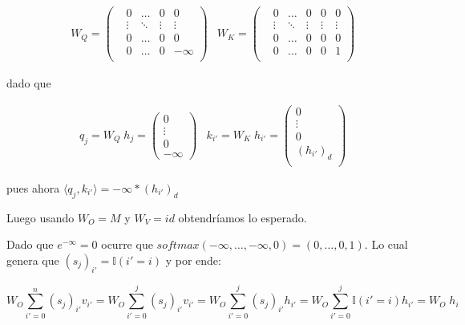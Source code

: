\begin{align*}
    & W_Q = \left(\begin{matrix}
    &0      &\hdots &0      &0          \\
    &\vdots &\ddots &\vdots &\vdots     \\
    &0      &\hdots &0      &0          \\
    &0      &\hdots &0      &-\infty    \\
\end{matrix}\right)
    &W_K = \left(\begin{matrix}
    &0      &\hdots &0      &0      &0      \\
    &\vdots &\ddots &\vdots &\vdots &\vdots \\
    &0      &\hdots &0      &0      &0      \\
    &0      &\hdots &0      &0      &1      \\
\end{matrix}\right)
\end{align*}


dado que


\begin{align*}
    &q_{j} = W_Q \; h_j = \left(\begin{matrix}
        0 \\
        \vdots \\
        0 \\
        -\infty
    \end{matrix}\right)
    &k_{i'} = W_K \; h_{i'} = \left(\begin{matrix}
        0 \\
        \vdots \\
        0 \\
        (h_{i'})_{d} \\
    \end{matrix}\right)
\end{align*}

pues ahora $\langle q_{j}, k_{i'} \rangle = -\infty *(h_{i'})_{d}$

\bigskip

Luego usando $W_O = M$ y $W_V = id$ obtendríamos lo esperado.

Dado que $e^{-\infty} = 0$ ocurre que $softmax(-\infty, \dots, -\infty, 0) = (0, \dots, 0, 1)$. Lo cual genera que $(s_j)_{i'} = \mathbb{I}(i' = i)$ y por ende:

\[
  W_O \sum_{i'=0}^{n} (s_j)_{i'} v_{i'} = 
  W_O \sum_{i'=0}^{j} (s_j)_{i'} v_{i'} = 
  W_O \sum_{i'=0}^{j} (s_j)_{i'} h_{i'} = 
  W_O \sum_{i'=0}^{j} \mathbb{I}(i' = i) h_{i'} = 
  W_O \; h_i
\]















